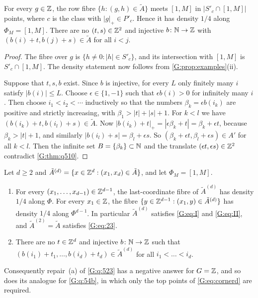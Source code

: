 \begin{lemma}\label{G:lem:Ztransfer}
For every $g\in\mathbb{Z}$, the row fibre $\{h:(g,h)\in \tilde A\}$ meets $[1,M]$ in
$|S'_c\cap[1,M]|$ points, where $c$ is the class with $|g|_+\in P'_c$. Hence it has
density $1/4$ along $\Phi_M=[1,M]$. There are no $(t,s)\in\mathbb{Z}^2$ and injective
$b\colon\mathbb{N}\to\mathbb{Z}$ with $(b(i)+t,b(j)+s)\in \tilde A$ for all $i<j$.
\end{lemma}

\begin{proof}
The fibre over $g$ is $\{h\neq0:|h|\in S'_c\}$, and its intersection with $[1,M]$ is
$S'_c\cap[1,M]$. The density statement now follows from
\cref{G:prop:examples}(ii).

Suppose that $t,s,b$ exist. Since $b$ is injective, for every $L$ only finitely many $i$
satisfy $|b(i)|\le L$. Choose $\epsilon\in\{1,-1\}$ such that $\epsilon b(i)>0$ for
infinitely many $i$. Then choose $i_1<i_2<\cdots$ inductively so that the numbers
$\beta_k=\epsilon b(i_k)$ are positive and strictly increasing, with
$\beta_1>|t|+|s|+1$. For $k<l$ we have $(b(i_k)+t,b(i_l)+s)\in \tilde A$. Now
$|b(i_k)+t|_+=|\epsilon\beta_k+t|=\beta_k+\epsilon t$, because $\beta_k>|t|+1$, and similarly
$|b(i_l)+s|=\beta_l+\epsilon s$. So $(\beta_k+\epsilon t,\beta_l+\epsilon s)\in A'$ for all
$k<l$. Then the infinite set $B=\{\beta_k\}\subset\mathbb{N}$ and the translate
$(\epsilon t,\epsilon s)\in\mathbb{Z}^2$ contradict \cref{G:thm:q510}.
\end{proof}

\begin{theorem}\label{G:thm:repairA}
Let $d\ge2$ and $\tilde A^{(d)}=\{x\in\mathbb{Z}^d:(x_1,x_d)\in \tilde A\}$, and let $\Phi_M=[1,M]$.
\begin{enumerate}[label=\textup{(\roman*)}]
\item For every $(x_1,\dots,x_{d-1})\in\mathbb{Z}^{d-1}$, the last-coordinate fibre of $\tilde A^{(d)}$ has
density $1/4$ along $\Phi$. For every $x_1\in\mathbb{Z}$, the fibre
$\{y\in\mathbb{Z}^{d-1}:(x_1,y)\in \tilde A^{(d)}\}$ has density $1/4$ along $\Phi^{d-1}$. In particular
$\tilde A^{(d)}$ satisfies \eqref{G:eq:I} and \eqref{G:eq:II}, and $\tilde A^{(2)}=\tilde A$ satisfies
\eqref{G:eq:23}.
\item There are no $t\in\mathbb{Z}^d$ and injective $b\colon\mathbb{N}\to\mathbb{Z}$ such that
$(b(i_1)+t_1,\dots,b(i_d)+t_d)\in \tilde A^{(d)}$ for all $i_1<\dots<i_d$.
\end{enumerate}
Consequently repair~(a) of \cref{G:q:523} has a negative answer for $G=\mathbb{Z}$, and so does
its analogue for \cref{G:q:54b}, in which only the top points of \eqref{G:eq:cornerd}
are required.
\end{theorem}

